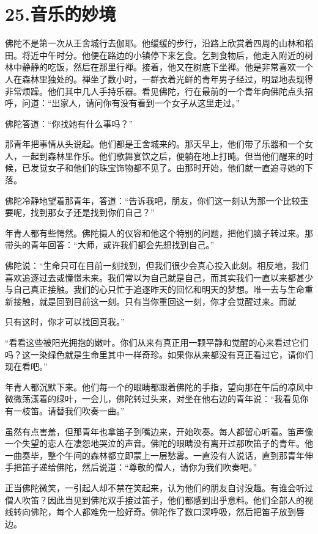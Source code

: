 \documentclass[12pt,twoside,openany]{book}
\begin{document}
\chapter{25.音乐的妙境}\label{ch25}

佛陀不是第一次从王舍城行去伽耶。他缓缓的步行，沿路上欣赏着四周的山林和稻田。将近中午时分。他便在路边的小镇停下来乞食。乞到食物后，他走入附近的树林中静静的吃饭，然后在那里行禅。接着，他又在树底下坐禅。他是非常喜欢一个人在森林里独处的。禅坐了数小时，一群衣着光鲜的青年男子经过，明显地表现得非常烦躁。他们其中几人手持乐器。看见佛陀，行在最前的一个青年向佛陀点头招呼，问道：“出家人，请问你有没有看到一个女子从这里走过。”

佛陀答道：“你找她有什么事吗？”

那青年把事情从头说起。他们都是王舍城来的。那天早上，他们带了乐器和一个女人，一起到森林里作乐。他们歌舞宴饮之后，便躺在地上打盹。但当他们醒来的时候，已发觉女子和他们的珠宝饰物都不见了。由那时开始，他们就一直追寻她的下落。

佛陀冷静地望着那青年，答道：“告诉我吧，朋友，你们这一刻认为那一个比较重要呢，找到那女子还是找到你们自己？”

年青人都有些愕然。佛陀摄人的仪容和他这个特别的问题，把他们脑子转过来。那带头的青年回答：“大师，或许我们都会先想找到自己。”

佛陀说：“生命只可在目前一刻找到，但我们很少会真心投入此刻。相反地，我们喜欢追逐过去或憧憬未来。我们常以为自己就是自己，而其实我们一直以来都甚少与自己真正接触。我们的心只忙于追逐昨天的回忆和明天的梦想。唯一去与生命重新接触，就是回到目前这一刻。只有当你重回这一刻，你才会觉醒过来。而就

只有这时，你才可以找回真我。”

“看看这些被阳光拥抱的嫩叶。你们从来有真正用一颗平静和觉醒的心来看过它们吗？这一染绿色就是生命里其中一样奇珍。如果你从来都没有真正看过它，请你们现在看吧。”

年青人都沉默下来。他们每一个的眼睛都跟着佛陀的手指，望向那在午后的凉风中微微荡漾着的绿叶，一会儿，佛陀转过头来，对坐在他右边的青年说：“我看见你有一枝笛。请替我们吹奏一曲。”

虽然有点害羞，但那青年也拿笛子到嘴边来，开始吹奏。每人都留心听着。笛声像一个失望的恋人在凄怨地哭泣的声音。佛陀的眼睛没有离开过那吹笛子的青年。他一曲奏毕，整个午间的森林都立即蒙上一层愁雾。一直没有人说话，直到那青年伸手把笛子递给佛陀，然后说道：“尊敬的僧人，请你为我们吹奏吧。”

正当佛陀微笑，一引起人却不禁在笑起来，认为他们的朋友自讨没趣。有谁会听过僧人吹笛？因此当见到佛陀双手接过笛子，他们都感到出乎意料。他们全部人的视线转向佛陀，每个人都难免一脸好奇。佛陀作了数口深呼吸，然后把笛子放到唇边。
\end{document}

